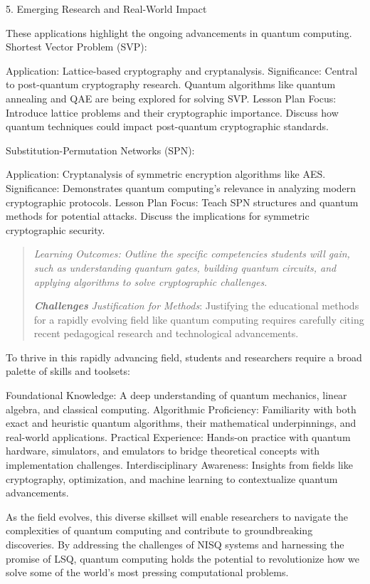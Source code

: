 5. Emerging Research and Real-World Impact

These applications highlight the ongoing advancements in quantum computing.
Shortest Vector Problem (SVP):

Application: Lattice-based cryptography and cryptanalysis.
Significance:
Central to post-quantum cryptography research.
Quantum algorithms like quantum annealing and QAE are being explored for solving SVP.
Lesson Plan Focus:
Introduce lattice problems and their cryptographic importance.
Discuss how quantum techniques could impact post-quantum cryptographic standards.

Substitution-Permutation Networks (SPN):

Application: Cryptanalysis of symmetric encryption algorithms like AES.
Significance:
Demonstrates quantum computing’s relevance in analyzing modern cryptographic protocols.
Lesson Plan Focus:
Teach SPN structures and quantum methods for potential attacks.
Discuss the implications for symmetric cryptographic security.


\begin{quote}\itshape
	\emph{Learning Outcomes}: Outline the specific competencies students will gain, such as understanding quantum gates, building quantum circuits, and applying algorithms to solve cryptographic challenges.
	
	\textbf{\emph{Challenges}}
	\emph{Justification for Methods}: Justifying the educational methods for a rapidly evolving field like quantum computing requires carefully citing recent pedagogical research and technological advancements.
\end{quote}\ignorespacesafterend

To thrive in this rapidly advancing field, students and researchers require a broad palette of skills and toolsets:

Foundational Knowledge: A deep understanding of quantum mechanics, linear algebra, and classical computing.
Algorithmic Proficiency: Familiarity with both exact and heuristic quantum algorithms, their mathematical underpinnings, and real-world applications.
Practical Experience: Hands-on practice with quantum hardware, simulators, and emulators to bridge theoretical concepts with implementation challenges.
Interdisciplinary Awareness: Insights from fields like cryptography, optimization, and machine learning to contextualize quantum advancements.

As the field evolves, this diverse skillset will enable researchers to navigate the complexities of quantum computing and contribute to groundbreaking discoveries. By addressing the challenges of NISQ systems and harnessing the promise of LSQ, quantum computing holds the potential to revolutionize how we solve some of the world’s most pressing computational problems.


